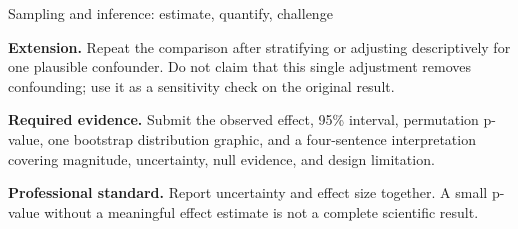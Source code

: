 \begin{labproject}{Sampling and inference: estimate, quantify, challenge}
\begin{tryit}
\textbf{Extension.} Repeat the comparison after stratifying or adjusting descriptively for one plausible confounder. Do not claim that this single adjustment removes confounding; use it as a sensitivity check on the original result.
\end{tryit}

\tcbbreak

\begin{verification}
\textbf{Required evidence.} Submit the observed effect, 95\% interval, permutation p-value, one bootstrap distribution graphic, and a four-sentence interpretation covering magnitude, uncertainty, null evidence, and design limitation.

\textbf{Professional standard.} Report uncertainty and effect size together. A small p-value without a meaningful effect estimate is not a complete scientific result.
\end{verification}
\end{labproject}
